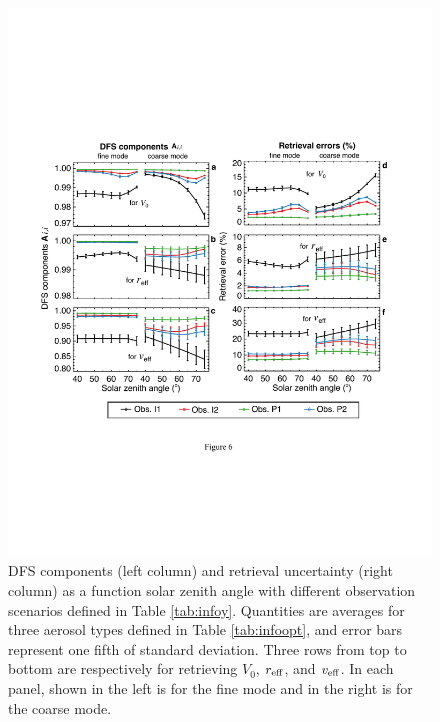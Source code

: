 \begin{figure}[t]
  \centering
  \includegraphics[width={\textwidth}]{figures/info06.pdf}
  \caption[DFS components and retrieval uncertainty for retrieving
$V_0$, $\reff$, and $\veff$ as a function solar zenith angle with different 
observation scenarios.]
  {DFS components (left column) and retrieval uncertainty (right
column) as a function solar zenith angle with different observation scenarios
defined in Table \ref{tab:infoy}. Quantities are averages for three aerosol 
types defined in Table \ref{tab:infoopt}, and error bars represent 
one fifth of standard deviation. Three rows from top to bottom are 
respectively for retrieving $V_0$, $\reff$, and $\veff$. In
each panel, shown in the left is for the fine mode and in the right is for the
coarse mode.}
  \label{fig:infodfspsd1}
\end{figure}

